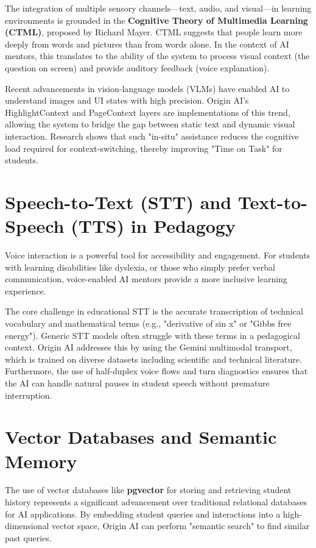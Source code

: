The integration of multiple sensory channels—text, audio, and visual—in learning environments is grounded in the \textbf{Cognitive Theory of Multimedia Learning (CTML)}, proposed by Richard Mayer. CTML suggests that people learn more deeply from words and pictures than from words alone. In the context of AI mentors, this translates to the ability of the system to process visual context (the question on screen) and provide auditory feedback (voice explanation).

Recent advancements in vision-language models (VLMs) have enabled AI to understand images and UI states with high precision. Origin AI's HighlightContext and PageContext layers are implementations of this trend, allowing the system to bridge the gap between static text and dynamic visual interaction. Research shows that such "in-situ" assistance reduces the cognitive load required for context-switching, thereby improving "Time on Task" for students.

\section{Speech-to-Text (STT) and Text-to-Speech (TTS) in Pedagogy}

Voice interaction is a powerful tool for accessibility and engagement. For students with learning disabilities like dyslexia, or those who simply prefer verbal communication, voice-enabled AI mentors provide a more inclusive learning experience.

The core challenge in educational STT is the accurate transcription of technical vocabulary and mathematical terms (e.g., "derivative of sin x" or "Gibbs free energy"). Generic STT models often struggle with these terms in a pedagogical context. Origin AI addresses this by using the Gemini multimodal transport, which is trained on diverse datasets including scientific and technical literature. Furthermore, the use of half-duplex voice flows and turn diagnostics ensures that the AI can handle natural pauses in student speech without premature interruption.

\section{Vector Databases and Semantic Memory}

The use of vector databases like \textbf{pgvector} for storing and retrieving student history represents a significant advancement over traditional relational databases for AI applications. By embedding student queries and interactions into a high-dimensional vector space, Origin AI can perform "semantic search" to find similar past queries.

